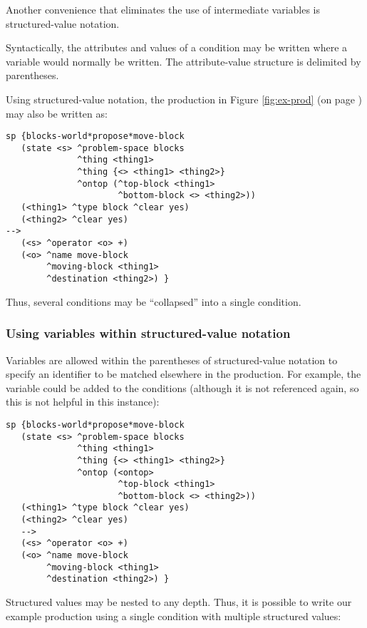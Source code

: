 Another convenience that eliminates the use of intermediate variables is structured-value notation.

Syntactically, the attributes and values of a condition may be written where a variable would normally be written. The attribute-value structure is delimited by parentheses.

Using structured-value notation, the production in Figure \ref{fig:ex-prod} (on page \pageref{fig:ex-prod}) may also be written as:

\begin{verbatim}
sp {blocks-world*propose*move-block
   (state <s> ^problem-space blocks
              ^thing <thing1>
              ^thing {<> <thing1> <thing2>}
              ^ontop (^top-block <thing1>
                      ^bottom-block <> <thing2>))
   (<thing1> ^type block ^clear yes)
   (<thing2> ^clear yes)
-->
   (<s> ^operator <o> +)
   (<o> ^name move-block
        ^moving-block <thing1>
        ^destination <thing2>) }
\end{verbatim}

Thus, several conditions may be ``collapsed'' into a single condition.


\subsubsection*{Using variables within structured-value notation}

Variables are allowed within the parentheses of structured-value notation to specify an identifier to be matched elsewhere in the production. For example, the variable  could be added to the conditions (although it is not referenced again, so this is not helpful in this instance):

\begin{verbatim}
sp {blocks-world*propose*move-block
   (state <s> ^problem-space blocks
              ^thing <thing1>
              ^thing {<> <thing1> <thing2>}
              ^ontop (<ontop>
                      ^top-block <thing1>
                      ^bottom-block <> <thing2>))
   (<thing1> ^type block ^clear yes)
   (<thing2> ^clear yes)
   -->
   (<s> ^operator <o> +)
   (<o> ^name move-block
        ^moving-block <thing1>
        ^destination <thing2>) }
\end{verbatim}

Structured values may be nested to any depth. Thus, it is possible to write our example production using a single condition with multiple structured values:


